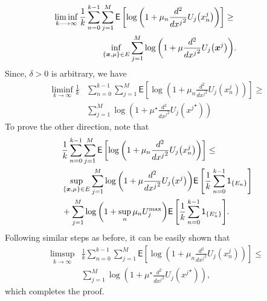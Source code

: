 \documentclass[10pt,twocolumn,twoside]{IEEEtran}
\begin{document}
\begin{IEEEproof}
\begin{align}
&\hspace{-1cm}\liminf_{k\longrightarrow \infty}\frac{1}{k}\sum_{n=0}^{k-1}\sum_{j=1}^M{\ensuremath{\mathsf{E}\left[{{\ensuremath{\log{\left({{1+\mu_n\frac{d ^2}{d {x^j}^2}U_{j}{\left({{x}^{j}_{n}}\right)}}}\right)}}}} \right]}}
\geq\nonumber\\
& \hspace{1cm}\inf_{\left\{{\ensuremath{\boldsymbol{{x}}}},\mu\right\}\in E}\sum_{j=1}^M{\ensuremath{\log{\left({{1+\mu \frac{d^2}{d {x^j}^2} U_j{\left({{\ensuremath{\boldsymbol{{x}}}}^{j}}\right)}}}\right)}}}.\nonumber
\end{align}
Since, $\delta>0$ is arbitrary, we have
\begin{align}
\liminf_{k\longrightarrow \infty}\frac{1}{k}&\sum_{n=0}^{k-1}\sum_{j=1}^M{\ensuremath{\mathsf{E}\left[{{\ensuremath{\log{\left({{1+\mu_n\frac{d ^2}{d {x^j}^2}U_{j}{\left({{x}^{j}_{n}}\right)}}}\right)}}}} \right]}}
\geq\nonumber\\
& \sum_{j=1}^M{\ensuremath{\log{\left({{1+\mu^\star \frac{d^2}{d {x^j}^2} U_j{\left({{{x}^{j}}^\star}\right)}}}\right)}}}\nonumber
\end{align}
To prove the other direction, note that
\begin{align}
&\frac{1}{k}\sum_{n=0}^{k-1}\sum_{j=1}^M{\ensuremath{\mathsf{E}\left[{{\ensuremath{\log{\left({{1+\mu_n\frac{d ^2}{d {x^j}^2}U_{j}{\left({{x}^{j}_{n}}\right)}}}\right)}}}} \right]}}\leq\nonumber\\
& \sup_{\left\{{\ensuremath{\boldsymbol{{x}}}},\mu\right\}\in E}\sum_{j=1}^M{\ensuremath{\log{\left({{1+\mu \frac{d^2}{d {x^j}^2} U_j{\left({{x}^{j}}\right)}}}\right)}}}{\ensuremath{\mathsf{E}\left[{\frac{1}{k}\sum_{n=0}^{k-1}{\ensuremath{\mathsf{1}_{\left\{{E_n}\right\}}}}} \right]}}\nonumber\\
&+\sum_{j=1}^M{\ensuremath{\log{\left({{1+\sup_n\mu_nU^{\rm max}_j}}\right)}}}{\ensuremath{\mathsf{E}\left[{\frac{1}{k}\sum_{n=0}^{k-1}{\ensuremath{\mathsf{1}_{\left\{{E^{c}_n}\right\}}}}} \right]}}.\nonumber
\end{align}
Following similar steps as before, it can be easily shown that
\begin{align}
\limsup_{k\longrightarrow \infty}&\frac{1}{k}\sum_{n=0}^{k-1}\sum_{j=1}^M{\ensuremath{\mathsf{E}\left[{{\ensuremath{\log{\left({{1+\mu_n\frac{d ^2}{d {x^j}^2}U_{j}{\left({{x}^{j}_{n}}\right)}}}\right)}}}} \right]}}
\leq\nonumber\\
& \sum_{j=1}^M{\ensuremath{\log{\left({{1+\mu^\star\frac{d^2}{d {x^j}^2} U_j{\left({{{x}^{j}}^\star}\right)}}}\right)}}},\nonumber
\end{align}
which completes the proof.
\end{IEEEproof}
\end{document}
